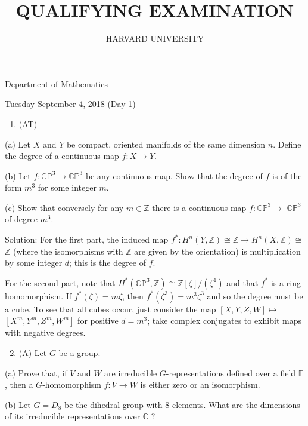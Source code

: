 \documentclass[10pt]{article}
\title{QUALIFYING EXAMINATION }
\author{HARVARD UNIVERSITY}
\date{}
\begin{document}
\maketitle
Department of Mathematics

Tuesday September 4, 2018 (Day 1)

\begin{enumerate}
  \item (AT)
\end{enumerate}

(a) Let $X$ and $Y$ be compact, oriented manifolds of the same dimension $n$. Define the degree of a continuous map $f: X \rightarrow Y$.

(b) Let $f: \mathbb{C P}^{3} \rightarrow \mathbb{C P}^{3}$ be any continuous map. Show that the degree of $f$ is of the form $m^{3}$ for some integer $m$.

(c) Show that conversely for any $m \in \mathbb{Z}$ there is a continuous map $f: \mathbb{C P}^{3} \rightarrow$ $\mathbb{C P}^{3}$ of degree $m^{3}$.

Solution: For the first part, the induced map $f^{*}: H^{n}(Y, \mathbb{Z}) \cong \mathbb{Z} \rightarrow H^{n}(X, \mathbb{Z}) \cong$ $\mathbb{Z}$ (where the isomorphisms with $\mathbb{Z}$ are given by the orientation) is multiplication by some integer $d$; this is the degree of $f$.

For the second part, note that $H^{*}\left(\mathbb{C P}^{3}, \mathbb{Z}\right) \cong \mathbb{Z}[\zeta] /\left(\zeta^{4}\right)$ and that $f^{*}$ is a ring homomorphism. If $f^{*}(\zeta)=m \zeta$, then $f^{*}\left(\zeta^{3}\right)=m^{3} \zeta^{3}$ and so the degree must be a cube. To see that all cubes occur, just consider the map $[X, Y, Z, W] \mapsto$ $\left[X^{m}, Y^{m}, Z^{m}, W^{m}\right]$ for positive $d=m^{3}$; take complex conjugates to exhibit maps with negative degrees.

\begin{enumerate}
  \setcounter{enumi}{1}
  \item (A) Let $G$ be a group.
\end{enumerate}

(a) Prove that, if $V$ and $W$ are irreducible $G$-representations defined over a field $\mathbb{F}$, then a $G$-homomorphism $f: V \rightarrow W$ is either zero or an isomorphism.

(b) Let $G=D_{8}$ be the dihedral group with 8 elements. What are the dimensions of its irreducible representations over $\mathbb{C}$ ?
\end{document}
